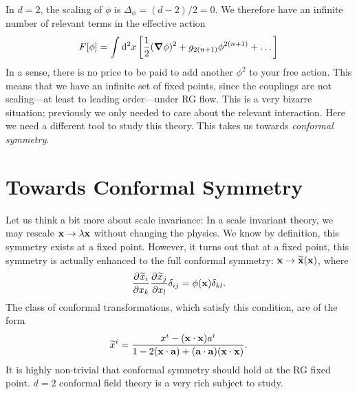 In $d = 2$, the scaling of $\phi$ is $\Delta_\phi = (d-2)/2 = 0$. We therefore have an infinite number of relevant terms in the effective action
\begin{equation}
  F[\phi] = \int \dd[2]{x} \left[ \frac{1}{2} (\grad \phi)^2+ g_{2(n+1)} \phi^{2(n+1)} +\dots \right]
\end{equation}
In a sense, there is no price to be paid to add another $\phi^2$ to your free action.
This means that we have an infinite set of fixed points, since the couplings are not scaling---at least to leading order---under RG flow.
This is a very bizarre situation; previously we only needed to care about the relevant interaction.
Here we need a different tool to study this theory.
This takes us towards \emph{conformal symmetry}.

\section{Towards Conformal Symmetry}%
\label{sec:towards_conformal_symmetry}

Let us think a bit more about scale invariance: In a scale invariant theory, we may rescale $\vb{x} \to \lambda \vb{x}$ without changing the physics. We know by definition, this symmetry exists at a fixed point.
However, it turns out that at a fixed point, this symmetry is actually enhanced to the full conformal symmetry: $\vb{x} \to \widetilde{\vb{x}}(\vb{x})$, where
\begin{equation}
  \frac{\partial^{} \widetilde{x}_i}{\partial x_k} \frac{\partial^{} \widetilde{x}_j}{\partial x_l} \delta_{ij} = \phi(\vb{x}) \delta_{kl}.
\end{equation}
The class of conformal transformations, which satisfy this condition, are of the form
\begin{equation}
  \widetilde{x}^i = \frac{x^i - (\vb{x} \cdot \vb{x}) a^i}{1 - 2 (\vb{x} \cdot \vb{a}) + (\vb{a} \cdot \vb{a})(\vb{x} \cdot \vb{x})}.
\end{equation}
It is highly non-trivial that conformal symmetry should hold at the RG fixed point.
$d = 2$ conformal field theory is a very rich subject to study.
